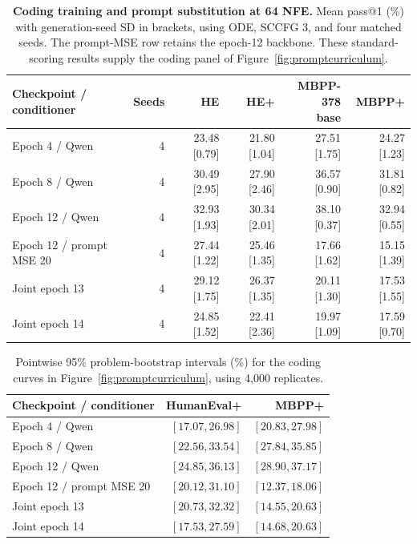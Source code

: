 \documentclass[11pt,letterpaper]{article}
\begin{document}
\begin{table}[htbp]
\centering\small
\setlength{\tabcolsep}{3pt}
\caption{\textbf{Coding training and prompt substitution at 64 NFE.} Mean pass@1 (\%) with generation-seed SD in brackets, using ODE, SCCFG 3, and four matched seeds. The prompt-MSE row retains the epoch-12 backbone. These standard-scoring results supply the coding panel of Figure~\ref{fig:promptcurriculum}.}
\label{tab:codingstages}
\begin{tabular}{@{}lrrrrr@{}}
\toprule
Checkpoint / conditioner & Seeds & HE & HE+ & \shortstack{MBPP-378\\base} & MBPP+\\
\midrule
Epoch 4 / Qwen & 4 & 23.48 {\scriptsize [0.79]} & 21.80 {\scriptsize [1.04]} & 27.51 {\scriptsize [1.75]} & 24.27 {\scriptsize [1.23]}\\
Epoch 8 / Qwen & 4 & 30.49 {\scriptsize [2.95]} & 27.90 {\scriptsize [2.46]} & 36.57 {\scriptsize [0.90]} & 31.81 {\scriptsize [0.82]}\\
Epoch 12 / Qwen & 4 & 32.93 {\scriptsize [1.93]} & 30.34 {\scriptsize [2.01]} & 38.10 {\scriptsize [0.37]} & 32.94 {\scriptsize [0.55]}\\
Epoch 12 / prompt MSE 20 & 4 & 27.44 {\scriptsize [1.22]} & 25.46 {\scriptsize [1.35]} & 17.66 {\scriptsize [1.62]} & 15.15 {\scriptsize [1.39]}\\
Joint epoch 13 & 4 & 29.12 {\scriptsize [1.75]} & 26.37 {\scriptsize [1.35]} & 20.11 {\scriptsize [1.30]} & 17.53 {\scriptsize [1.55]}\\
Joint epoch 14 & 4 & 24.85 {\scriptsize [1.52]} & 22.41 {\scriptsize [2.36]} & 19.97 {\scriptsize [1.09]} & 17.59 {\scriptsize [0.70]}\\
\bottomrule
\end{tabular}
\end{table}

\begin{table}[htbp]
\centering\small
\setlength{\tabcolsep}{3pt}
\caption{Pointwise 95\% problem-bootstrap intervals (\%) for the coding curves in Figure~\ref{fig:promptcurriculum}, using 4,000 replicates.}
\label{tab:codingstageintervals}
\begin{tabular}{@{}lrr@{}}
\toprule
Checkpoint / conditioner & HumanEval+ & MBPP+\\
\midrule
Epoch 4 / Qwen & $[17.07,26.98]$ & $[20.83,27.98]$\\
Epoch 8 / Qwen & $[22.56,33.54]$ & $[27.84,35.85]$\\
Epoch 12 / Qwen & $[24.85,36.13]$ & $[28.90,37.17]$\\
Epoch 12 / prompt MSE 20 & $[20.12,31.10]$ & $[12.37,18.06]$\\
Joint epoch 13 & $[20.73,32.32]$ & $[14.55,20.63]$\\
Joint epoch 14 & $[17.53,27.59]$ & $[14.68,20.63]$\\
\bottomrule
\end{tabular}
\end{table}
\end{document}
